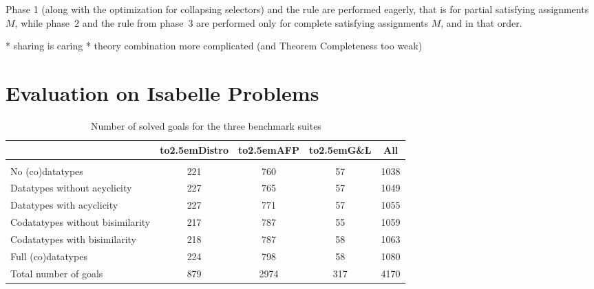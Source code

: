 Phase 1 (along with the optimization for collapsing selectors) and the  rule are performed eagerly, 
that is for partial satisfying assignments $M$, while phase~2 and the  rule from phase~3 are performed only for complete satisfying assignments $M$, and in that order.

    * sharing is caring
    * theory combination more complicated (and Theorem Completeness too weak)



\section{Evaluation on Isabelle Problems}
\label{sec:experimental-results}

\newcommand\gandl{G\&L}
\newcommand\HD[1]{\hbox to2.5em{\hfill#1\hfill}}

\begin{table*}[tbh!]
\normalsize
\begin{center}\begin{tabular}{l@{\kern1.5em}c@{\kern.5em}c@{\kern.5em}c@{\kern1.5em}c}
  & \HD{Distro} & \HD{AFP} & \HD{\gandl} & All
\\[1pt] %
\midrule
\\[-9pt] %
No (co)datatypes
  & 221 & 760 & \phantom{0}57 & 1038 \\
Datatypes without acyclicity
  & 227 & 765 & \phantom{0}57 & 1049 \\
Datatypes with acyclicity
  & 227 & 771 & \phantom{0}57 & 1055 \\
Codatatypes without bisimilarity
  & 217 & 787 & \phantom{0}55 & 1059 \\
Codatatypes with bisimilarity
  & 218 & 787 & \phantom{0}58 & 1063 \\
Full (co)datatypes
  & 224 & 798 & \phantom{0}58 & 1080 \\[\jot]
Total number of goals
  & 879 & 2974\phantom{0} & 317 & 4170
\end{tabular}\end{center}
\caption{\,Number of solved goals for the three benchmark suites}
\label{tab:bench}
\end{table*}

